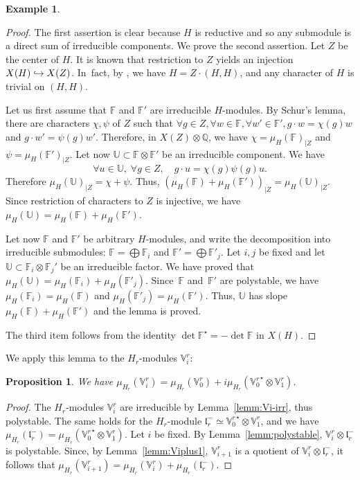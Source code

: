 \documentclass[10pt]{amsart}
\newcommand{\hto}{\mathrel{\lhook\joinrel\to}}
\newcommand{\citestar}[3]{\cite[#3]{#1}}
\theoremstyle{plain}
\newtheorem{prop}[theo]{Proposition}
\theoremstyle{definition}
\newtheorem{exem}[theo]{Example}
\let\rgy r
\newcommand{\bF}{\mathbb{F}}
\newcommand{\bU}{\mathbb{U}}
\newcommand{\bQ}{\mathbb{Q}}
\newcommand{\Vr}{\mathbb{V}^\rgy}
\newcommand{\fl}{\mathfrak{l}}
\begin{document}
\begin{exem}
\begin{proof} The first assertion is clear because $H$ is reductive and so any submodule
is a direct sum of irreducible components. We prove the second assertion.
Let $Z$ be the center of $H$. It is known that restriction to $Z$ yields an injection $X(H)
\hto X(Z)$. In~fact, by \citestar{borel}*{Prop.\,14.2},
we have $H=Z \cdot (H,H)$, and any character of $H$ is trivial on $(H,H)$.

Let us first assume that $\bF$ and $\bF'$ are irreducible $H$-modules. By Schur's lemma, there are
characters $\chi,\psi$ of $Z$ such that $\forall g \in Z, \forall w \in \bF, \forall w' \in \bF', g
\cdot w = \chi(g)w$
and $g \cdot w' = \psi(g)w'$. Therefore, in $X(Z) \otimes \bQ$, we have
$\chi = \mu_H(\bF)_{|Z}$ and $\psi = \mu_H(\bF')_{|Z}$.
Let now $\bU \subset \bF \otimes \bF'$ be an irreducible component. We have
$$\forall u \in \bU,\; \forall g \in Z,\quad g\cdot u = \chi(g) \psi(g) u.$$
Therefore $\mu_H(\bU)_{|Z} = \chi + \psi$.
Thus, ${(\mu_H(\bF)+\mu_H(\bF'))}_{|Z} = \mu_H(\bU)_{|Z}$.
Since restriction of characters to $Z$ is injective, we have $\mu_H(\bU) = \mu_H(\bF) + \mu_H(\bF')$.

Let now $\bF$ and $\bF'$ be arbitrary $H$-modules, and write the decomposition into irreducible submodules:
$\bF=\bigoplus \bF_i$ and $\bF'=\bigoplus \bF'_j$. Let $i,j$ be fixed and let $\bU \subset \bF_i
\otimes \bF_j'$ be an
irreducible factor. We have proved that $\mu_H(\bU)=\mu_H(\bF_i)+\mu_H(\bF'_j)$. Since~$\bF$ and~$\bF'$
are polystable,
we have $\mu_H(\bF_i)=\mu_H(\bF)$ and $\mu_H(\bF'_j)=\mu_H(\bF')$. Thus, $\bU$ has slope
$\mu_H(\bF)+\mu_H(\bF')$ and the lemma is proved.

The third item follows from the identity $\det \bF^\star = -\det \bF$ in $X(H)$.
\end{proof}

We apply this lemma to the $H_\rgy$-modules $\Vr_i$:

\begin{prop}
\label{prop:calcul-pente}
We have $\mu_{H_\rgy}(\Vr_i) = \mu_{H_\rgy}(\Vr_0)+i\mu_{H_\rgy}({\Vr_0}^\star \otimes \Vr_1)$.
\end{prop}
\begin{proof}
The $H_\rgy$-modules $\Vr_i$ are irreducible by Lemma~\ref{lemm:Vi-irr}, thus polystable.
The same holds for the $H_\rgy$-module $\fl_\rgy^-\simeq {\Vr_0}^\star \otimes \Vr_1$, and we have
$\mu_{H_\rgy}(\fl_\rgy^-) = \mu_{H_\rgy}({\Vr_0}^\star \otimes \Vr_1)$. Let $i$ be fixed.
By Lemma~\ref{lemm:polystable}, $\Vr_i \otimes \fl_\rgy^-$ is polystable. Since, by
Lemma~\ref{lemm:Viplus1},
$\Vr_{i+1}$ is a quotient of $\Vr_i \otimes \fl_\rgy^-$, it follows that
$\mu_{H_\rgy}(\Vr_{i+1}) = \mu_{H_\rgy}(\Vr_i) + \mu_{H_\rgy}(\fl_\rgy^-)$.
\end{proof}


\end{exem}
\end{document}
